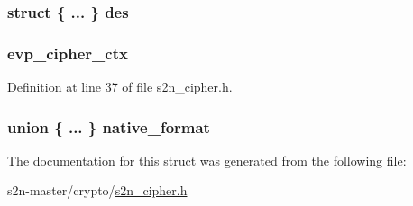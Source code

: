 \subsubsection[{\texorpdfstring{des}{des}}]{\setlength{\rightskip}{0pt plus 5cm}struct \{ ... \}   des}\hypertarget{structs2n__session__key_ac2afaf05c666514cce529e894fd8bf87}{}\label{structs2n__session__key_ac2afaf05c666514cce529e894fd8bf87}
\subsubsection[{\texorpdfstring{evp\+\_\+cipher\+\_\+ctx}{evp_cipher_ctx}}]{ evp\+\_\+cipher\+\_\+ctx}\hypertarget{structs2n__session__key_af56d0d167801d35add7ff05bb974e3e1}{}\label{structs2n__session__key_af56d0d167801d35add7ff05bb974e3e1}


Definition at line 37 of file s2n\+\_\+cipher.\+h.

\subsubsection[{\texorpdfstring{native\+\_\+format}{native_format}}]{\setlength{\rightskip}{0pt plus 5cm}union \{ ... \}   native\+\_\+format}\hypertarget{structs2n__session__key_afe527615e6e7d852f53125597340db87}{}\label{structs2n__session__key_afe527615e6e7d852f53125597340db87}


The documentation for this struct was generated from the following file\+:\begin{DoxyCompactItemize}
\item 
s2n-\/master/crypto/\hyperlink{s2n__cipher_8h}{s2n\+\_\+cipher.\+h}\end{DoxyCompactItemize}
